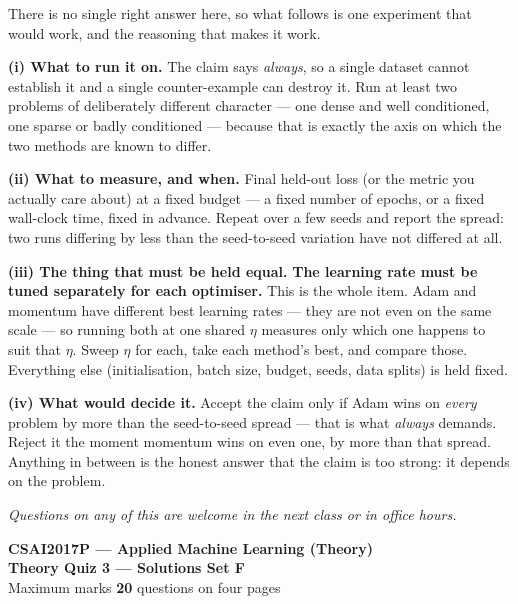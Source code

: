 \documentclass[10pt,a4paper]{article}
\newcommand{\SetLetter}{}
\begin{document}
There is no single right answer here, so what follows is one experiment that would work, and the reasoning that makes it work.\par\vspace{1mm}\textbf{(i) What to run it on.} The claim says \emph{always}, so a single dataset cannot establish it and a single counter-example can destroy it. Run at least two problems of deliberately different character --- one dense and well conditioned, one sparse or badly conditioned --- because that is exactly the axis on which the two methods are known to differ.\par\vspace{1mm}\textbf{(ii) What to measure, and when.} Final held-out loss (or the metric you actually care about) at a fixed budget --- a fixed number of epochs, or a fixed wall-clock time, fixed in advance. Repeat over a few seeds and report the spread: two runs differing by less than the seed-to-seed variation have not differed at all.\par\vspace{1mm}\textbf{(iii) The thing that must be held equal.} \textbf{The learning rate must be tuned separately for each optimiser.} This is the whole item. Adam and momentum have different best learning rates --- they are not even on the same scale --- so running both at one shared $\eta$ measures only which one happens to suit that $\eta$. Sweep $\eta$ for each, take each method's best, and compare those. Everything else (initialisation, batch size, budget, seeds, data splits) is held fixed.\par\vspace{1mm}\textbf{(iv) What would decide it.} Accept the claim only if Adam wins on \emph{every} problem by more than the seed-to-seed spread --- that is what \emph{always} demands. Reject it the moment momentum wins on even one, by more than that spread. Anything in between is the honest answer that the claim is too strong: it depends on the problem.

\vfill

{\footnotesize\itshape Questions on any of this are welcome in the next class or in office hours.}

\newpage


\renewcommand{\SetLetter}{F}\setcounter{page}{1}

\begin{center}
{\large\bfseries CSAI2017P --- Applied Machine Learning (Theory)}\\[2pt]
{\large\bfseries Theory Quiz 3 --- Solutions \quad\textbullet\quad Set F}\\[3pt]
{\small Maximum marks \textbf{20} \quad\textbullet{} questions on four pages}
\end{center}
\vspace{2pt}
\end{document}
